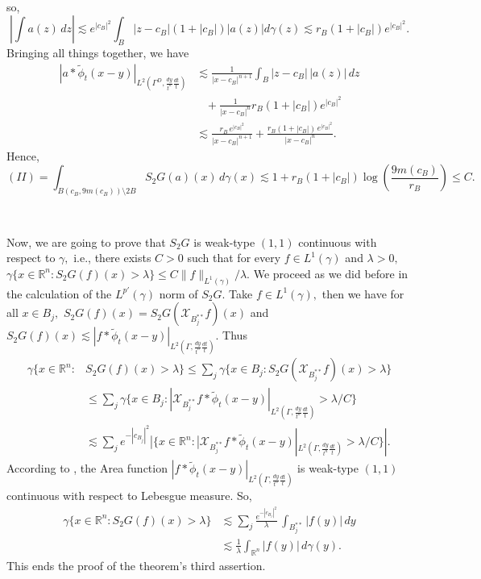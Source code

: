 \documentclass[leqno,11pt]{amsart}
\theoremstyle{plain}
\theoremstyle{remark}
\begin{document}
{{\begin{align*}
\end{align*}
so, $$\left|\int a(z)\, dz\right|\lesssim e^{|c_B|^2}\int_B |z-c_B|(1+|c_B|)|a(z)|d\gamma(z)\lesssim r_B(1+|c_B|) e^{|c_B|^2}.$$
Bringing all things together, we have
\begin{align*}|a\ast \widetilde{\phi}_t(x-y)|_{L^2(\Gamma^D, \frac{dy}{t^n}\frac{dt}{t})}&\lesssim \frac{1}{|x-c_B|^{n+1}}\int_B |z-c_B|\, |a(z)|\, dz\\
&\;\;\;+ \frac{1}{|x-c_B|^n}r_B(1+|c_B|)e^{|c_B|^2}\\ &\lesssim \frac{r_B\, e^{|c_B|^2}}{|x-c_B|^{n+1}}+\frac{r_B(1+|c_B|)\, e^{|c_B|^2}}{|x-c_B|^n}.\end{align*}
Hence, 
$$(II)=\int_{B(c_B, 9 m(c_B))\setminus 2B}S_2G(a)(x)\, d\gamma(x)\lesssim 1+r_B(1+|c_B|)\log\left(\frac{9m(c_B)}{r_B}\right)\le C.$$


\

Now, we are going to prove that $S_2G$ is weak-type $(1,1)$ continuous with respect to $\gamma,$ i.e.,  there exists $C>0$ such that for every $f\in L^1(\gamma)$ and $\lambda>0,$ $\gamma\{x\in \mathbb{R}^n: S_2G(f)(x)>\lambda\}\le C\|f\|_{L^1(\gamma)}/\lambda.$ We proceed as we did before in the calculation of the $L^{p'}(\gamma)$ norm of $S_2G.$ Take $f\in L^1(\gamma),$ then we have for all $x\in B_j,$ $S_2G(f)(x)=S_2G(\mathcal{X}_{B_j^{**}}f)(x)$ and $S_2G(f)(x)\lesssim |f\ast\widetilde{\phi}_t(x-y)|_{L^2(\Gamma, \frac{dy}{t^n}\frac{dt}{t})}.$ Thus
\begin{align*}
\gamma\{x\in\mathbb{R}^n: & S_2G(f)(x)>\lambda\} \le \sum_j \gamma\{x\in B_j: S_2G(\mathcal{X}_{B^{**}_j}f)(x)>\lambda\}
\\ & \le \sum_j \gamma\{x\in B_j: |\mathcal{X}_{B_j^{**}}f\ast \widetilde{\phi}_t (x-y)|_{L^2(\Gamma, \frac{dy}{t^n}\frac{dt}{t})}>\lambda/C\}
\\ & \lesssim \sum_j e^{-|c_{B_j}|^2} |\{x\in \mathbb{R}^n: |\mathcal{X}_{B_j^{**}}f\ast \widetilde{\phi}_t (x-y)|_{L^2(\Gamma, \frac{dy}{t^n}\frac{dt}{t})}>\lambda/C\}|.
\end{align*}
According to \cite{stein}, the Area function $|f\ast \widetilde{\phi}_t(x-y)|_{L^2(\Gamma, \frac{dy}{t^n}\frac{dt}{t})}$ is weak-type $(1,1)$ continuous with respect to Lebesgue measure. So,
\begin{align*}
\gamma\{x\in\mathbb{R}^n: S_2G(f)(x)>\lambda\}&\lesssim \sum_j \frac{e^{-|c_{B_j}|^2}}{\lambda}\, \int_{B^{**}_j}|f(y)|\, dy\\ & \lesssim \frac{1}{\lambda}\int_{\mathbb{R}^n}|f(y)|\, d\gamma(y).
\end{align*}
This ends the proof of the theorem's third assertion.
}}
\end{document}
